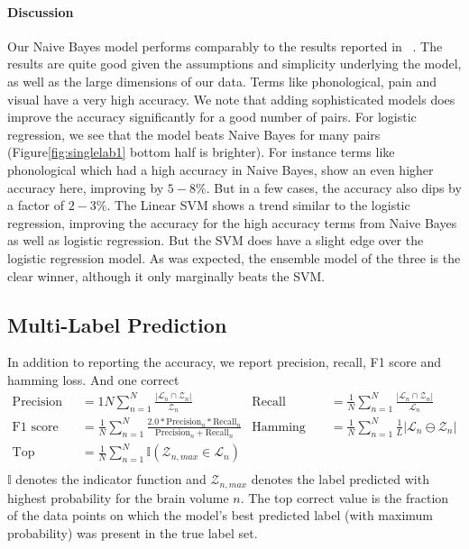 \documentclass{article} %
\begin{document}
\paragraph{Discussion} Our Naive Bayes model performs comparably to the results reported in ~\cite{yarkoni2011large}. The results are quite good given the assumptions and simplicity underlying the model, as well as the large dimensions of our data.
Terms like phonological, pain and visual have a very high accuracy. We note that adding sophisticated models does improve the accuracy significantly for a good number of pairs. For logistic regression, we see that the model beats Naive Bayes for many pairs (Figure\ref{fig:singlelab1} bottom half is brighter). For instance
terms like phonological which had a high accuracy in Naive Bayes, show an even higher accuracy here, improving by $5-8\%$. But in a few cases, the accuracy also dips by a factor of $2-3\%$.
The Linear SVM shows a trend similar to the logistic regression, improving the accuracy for the high accuracy terms from Naive Bayes as well as logistic regression. But the SVM does have a slight edge over the logistic regression model. As was expected, the ensemble model of the three is the clear winner, although it only marginally beats the SVM.

 \subsection{Multi-Label Prediction}
In addition to reporting the accuracy, we report precision, recall, F1 score and hamming loss. And one correct
\begin{align*}
 \text{Precision} &= {1}{N} \sum_{n=1}^{N} \frac {|\mathcal{L}_n \cap \mathcal{Z}_n|}{\mathcal{Z}_n}& \text{Recall}&= \frac{1}{N} \sum_{n=1}^{N} \frac {|\mathcal{L}_n \cap \mathcal{Z}_n|}{\mathcal{L}_n}\\
 \text{F1 score} &=\frac{1}{N} \sum_{n=1}^{N} \frac{2.0 * \text{Precision}_n * \text{Recall}_n}{\text{Precision}_n +\text{Recall}_n} & \text{Hamming loss}&=\frac{1}{N}\sum_{n=1}^{N}\frac{1}{L} |\mathcal{L}_n \ominus \mathcal{Z}_n | \\
 \text{Top correct} &=\frac{1}{N} \displaystyle\sum_{n=1}^{N} \mathbb{I}(\mathcal{Z}_{n,max} \in \mathcal{L}_n)& & \\
\end{align*}
$\mathbb{I}$ denotes the indicator function and $\mathcal{Z}_{n,max}$ denotes the label predicted with highest probability for the brain volume $n$. The top correct value is the fraction of the data points on which the model's best predicted label (with maximum probability) was present in the true label set.
\end{document}
